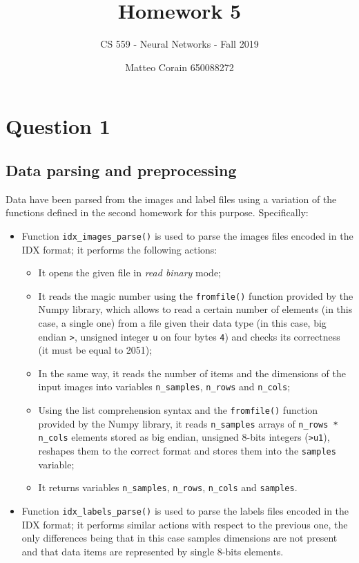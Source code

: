 \documentclass[letterpaper,headings=standardclasses]{scrartcl}
\title{Homework 5}
\subtitle{CS 559 - Neural Networks - Fall 2019}
\author{Matteo Corain 650088272}
\begin{document}
\maketitle

\section{Question 1}

\subsection{Data parsing and preprocessing}

Data have been parsed from the images and label files using a variation of the functions defined in the second homework for this purpose. Specifically:

\begin{itemize}

    \item Function \texttt{idx\_images\_parse()} is used to parse the images files encoded in the IDX format; it performs the following actions:

        \begin{itemize}

        \item It opens the given file in \emph{read binary} mode;

        \item It reads the magic number using the \texttt{fromfile()} function provided by the Numpy library, which allows to read a certain number of elements (in this case, a single one) from a file given their data type (in this case, big endian \texttt{>}, unsigned integer \texttt{u} on four bytes \texttt{4}) and checks its correctness (it must be equal to 2051);

        \item In the same way, it reads the number of items and the dimensions of the input images into variables \texttt{n\_samples}, \texttt{n\_rows} and \texttt{n\_cols};

        \item Using the list comprehension syntax and the \texttt{fromfile()} function provided by the Numpy library, it reads \texttt{n\_samples} arrays of \texttt{n\_rows * n\_cols} elements stored as big endian, unsigned 8-bits integers (\texttt{>u1}), reshapes them to the correct format and stores them into the \texttt{samples} variable;

        \item It returns variables \texttt{n\_samples}, \texttt{n\_rows}, \texttt{n\_cols} and \texttt{samples}.

        \end{itemize}

    \item Function \texttt{idx\_labels\_parse()} is used to parse the labels files encoded in the IDX format; it performs similar actions with respect to the previous one, the only differences being that in this case samples dimensions are not present and that data items are represented by single 8-bits elements.

\end{itemize}
\end{document}
